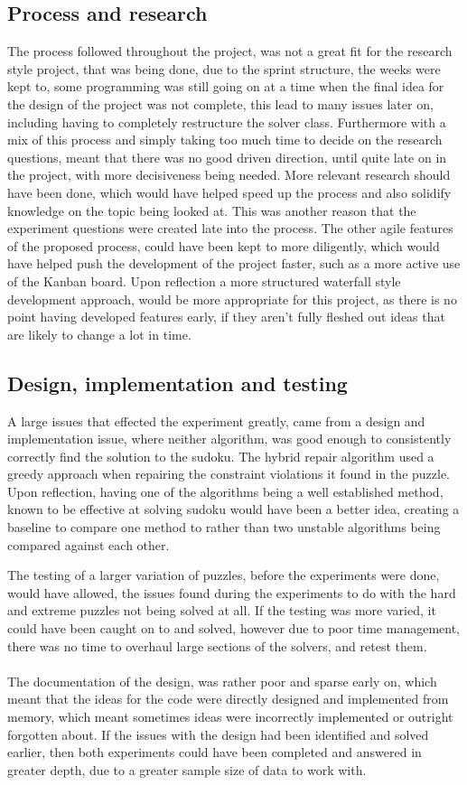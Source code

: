 \documentclass[a4paper,11pt]{article}
\begin{document}
\subsection{Process and research}
The process followed throughout the project, was not a great fit for the research style project, that was being done, due to the sprint structure, the weeks were kept to, some programming was still going on at a time when the final idea for the design of the project was not complete, this lead to many issues later on, including having to completely restructure the solver class. Furthermore with a mix of this process and simply taking too much time to decide on the research questions, meant that there was no good driven direction, until quite late on in the project, with more decisiveness being needed. More relevant research should have been done, which would have helped speed up the process and also solidify knowledge on the topic being looked at. This was another reason that the experiment questions were created late into the process. The other agile features of the proposed process, could have been kept to more diligently, which would have helped push the development of the project faster, such as a more active use of the Kanban board. Upon reflection a more structured waterfall style development approach, would be more appropriate for this project, as there is no point having developed features early, if they aren't fully fleshed out ideas that are likely to change a lot in time.

\subsection{Design, implementation and testing}
A large issues that effected the experiment greatly, came from a design and implementation issue, where neither algorithm, was good enough to consistently correctly find the solution to the sudoku. The hybrid repair algorithm used a greedy approach when repairing the constraint violations it found in the puzzle. Upon reflection, having one of the algorithms being a well established method, known to be effective at solving sudoku would have been a better idea, creating a baseline to compare one method to rather than two unstable algorithms being compared against each other.

The testing of a larger variation of puzzles, before the experiments were done, would have allowed, the issues found during the experiments to do with the hard and extreme puzzles not being solved at all. If the testing was more varied, it could have been caught on to and solved, however due to poor time management, there was no time to overhaul large sections of the solvers, and retest them. \\\\The documentation of the design, was rather poor and sparse early on, which meant that the ideas for the code were directly designed and implemented from memory, which meant sometimes ideas were incorrectly implemented or outright forgotten about. If the issues with the design had been identified and solved earlier, then both experiments could have been completed and answered in greater depth, due to a greater sample size of data to work with.
\end{document}
